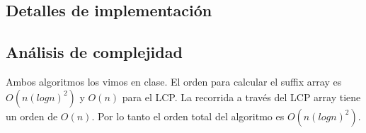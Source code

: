 \subsection*{Detalles de implementación}

\subsection*{Análisis de complejidad}

Ambos algoritmos los vimos en clase. El orden para calcular el suffix array es
$O(n(logn)^2)$ y $O(n)$ para el LCP. La recorrida a través del LCP array tiene un
orden de $O(n)$. Por lo tanto el orden total del algoritmo es $O(n(log n)^2)$.
